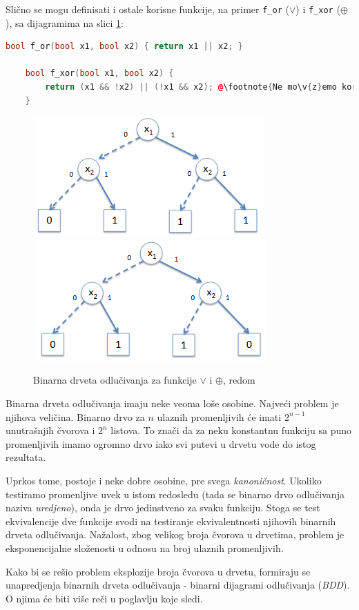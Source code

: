 \noindent Sli\v{c}no se mogu definisati i ostale korisne funkcije, na primer \texttt{f\_or} ($\vee$) i \texttt{f\_xor} ($\oplus$), sa dijagramima na slici \ref{fig:BDOrXor}:

\begin{lstlisting}[language=C++,escapechar=@]
    bool f_or(bool x1, bool x2) { return x1 || x2; }

    bool f_xor(bool x1, bool x2) {
        return (x1 && !x2) || (!x1 && x2); @\footnote{Ne mo\v{z}emo koristiti operator \^{} jer on operi\v{s}e nad promenljivima tipa \emph{int}, a ne \emph{bool}.}@
    }
\end{lstlisting}

\begin{figure}[H]
    \includegraphics[scale=0.68]{slike/BD_Or.PNG}
    \includegraphics[scale=0.68]{slike/BD_Xor.PNG}
    \caption{Binarna drveta odlu\v{c}ivanja za funkcije $\vee$ i $\oplus$, redom}
    \label{fig:BDOrXor}
\end{figure}

Binarna drveta odlu\v{c}ivanja imaju neke veoma lo\v{s}e osobine. Najve\'c{}i problem je njihova veli\v{c}ina. Binarno drvo za $n$ ulaznih promenljivih \'c{}e imati $2^{n-1}$ unutra\v{s}njih \v{c}vorova i $2^{n}$ listova. To zna\v{c}i da za neku konstantnu funkciju sa puno promenljivih imamo ogromno drvo iako svi putevi u drvetu vode do istog rezultata.

Uprkos tome, postoje i neke dobre osobine, pre svega \emph{kanoni\v{c}nost}. Ukoliko testiramo promenljive uvek u istom redosledu (tada se binarno drvo odlu\v{c}ivanja naziva \emph{uredjeno}), onda je drvo jedinstveno za svaku funkciju. Stoga se test ekvivalencije dve funkcije svodi na testiranje ekvivalentnosti njihovih binarnih drveta odlu\v{c}ivanja. Na\v{z}alost, zbog velikog broja \v{c}vorova u drvetima, problem je eksponencijalne slo\v{z}enosti u odnosu na broj ulaznih promenljivih.

Kako bi se re\v{s}io problem eksplozije broja \v{c}vorova u drvetu, formiraju se unapredjenja binarnih drveta odlu\v{c}ivanja - binarni dijagrami odlu\v{c}ivanja (\emph{BDD}). O njima \'c{}e biti vi\v{s}e re\v{c}i u poglavlju koje sledi.
